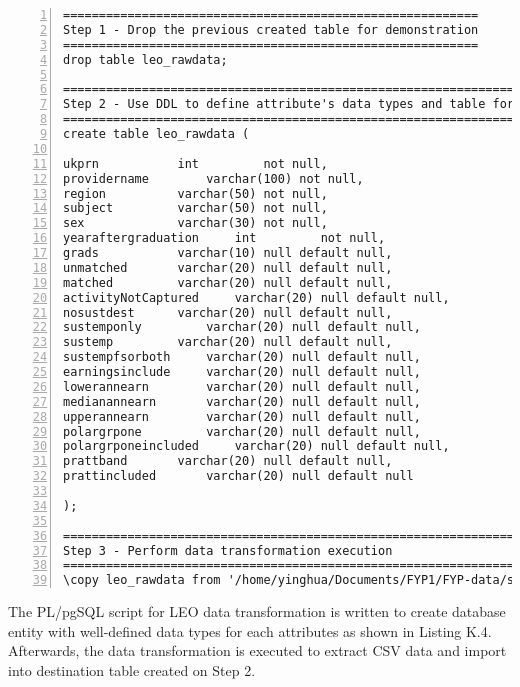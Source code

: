 \lstset{basicstyle=\ttfamily\tiny}  
\begin{lstlisting}[breaklines, frame=single, numbers=left, caption={PL/pgSQL's scripts for LEO data transformation.}, label=commandline-02]
==========================================================
Step 1 - Drop the previous created table for demonstration
==========================================================
drop table leo_rawdata;

===========================================================================================
Step 2 - Use DDL to define attribute's data types and table for data transformation purpose
===========================================================================================
create table leo_rawdata ( 

ukprn 			int         not null, 
providername 		varchar(100) not null,
region 			varchar(50) not null, 
subject 		varchar(50) not null, 
sex 			varchar(30) not null,
yearaftergraduation 	int 	    not null,
grads 			varchar(10) null default null,
unmatched 		varchar(20) null default null,
matched 		varchar(20) null default null,
activityNotCaptured 	varchar(20) null default null,
nosustdest 		varchar(20) null default null,
sustemponly 		varchar(20) null default null,
sustemp 		varchar(20) null default null,
sustempfsorboth 	varchar(20) null default null,
earningsinclude 	varchar(20) null default null,
lowerannearn 		varchar(20) null default null,
medianannearn 		varchar(20) null default null,
upperannearn 		varchar(20) null default null,
polargrpone 		varchar(20) null default null,
polargrponeincluded 	varchar(20) null default null,
prattband 		varchar(20) null default null,
prattincluded 		varchar(20) null default null

);

==================================================================================
Step 3 - Perform data transformation execution
==================================================================================
\copy leo_rawdata from '/home/yinghua/Documents/FYP1/FYP-data/subject-data/institution-subject-data.csv' with header csv;
\end{lstlisting}

The PL/pgSQL script for LEO data transformation is written to create database entity with well-defined data types for each attributes as shown in Listing K.4. Afterwards, the data transformation is executed to extract CSV data and import into destination table created on Step 2.

\newpage

